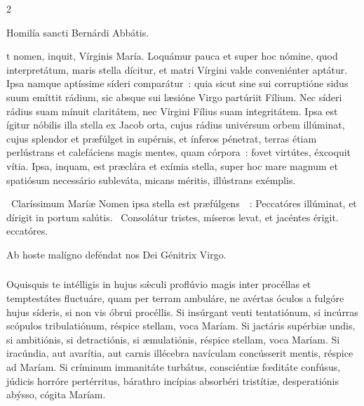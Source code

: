 \documentclass[9pt,twoside]{extarticle}
\begin{document}
\begin{multicols}{2}
{\begin{center}Homilía sancti Bernárdi Abbátis.\\
\end{center}
t nomen, inquit, Vírginis María. Loquámur pauca et super hoc nómine, quod interpretátum, maris stella dícitur, et matri Vírgini valde conveniénter aptátur. Ipsa namque aptíssime síderi comparátur~: quia sicut sine sui corruptióne sidus suum emíttit rádium, sic absque sui læsióne Virgo partúriit Fílium. Nec síderi rádius suam mínuit claritátem, nec Vírgini Fílius suam integritátem. Ipsa est ígitur nóbilis illa stella ex Jacob orta, cujus rádius univérsum orbem illúminat, cujus splendor et præfúlget in supérnis, et ínferos pénetrat, terras étiam perlústrans et calefáciens magis mentes, quam córpora~: fovet virtútes, éxcoquit vítia. Ipsa, inquam, est præclára et exímia stella, super hoc mare magnum et spatiósum necessário subleváta, micans méritis, illústrans exémplis.

\begin{tightlist}{}
\item {}~Claríssimum Maríæ Nomen ipsa stella est præfúlgens~~: \textred{*} Peccatóres illúminat, et dírigit in portum salútis. ~Consolátur tristes, míseros levat, et jacéntes érigit. eccatóres.
\item {\small {} Ab hoste malígno deféndat nos Dei Génitrix Virgo.}
\end{tightlist}

\subsubsection*{\center {}}
\lettrine{O} quisquis te intélligis in hujus sǽculi proflúvio magis inter procéllas et temptestátes fluctuáre, quam per terram ambuláre, ne avértas óculos a fulgóre hujus síderis, si non vis óbrui procéllis. Si insúrgant venti tentatiónum, si incúrras scópulos tribulatiónum, réspice stellam, voca Maríam. Si jactáris supérbiæ undis, si ambitiónis, si detractiónis, si æmulatiónis, réspice stellam, voca Maríam. Si iracúndia, aut avarítia, aut carnis illécebra navículam concússerit mentis, réspice ad Maríam. Si críminum immanitáte turbátus, consciéntiæ fœditáte confúsus, júdicis horróre pertérritus, bárathro incípias absorbéri tristítiæ, desperatiónis abýsso, cógita Maríam.

}
\end{multicols}
\end{document}
